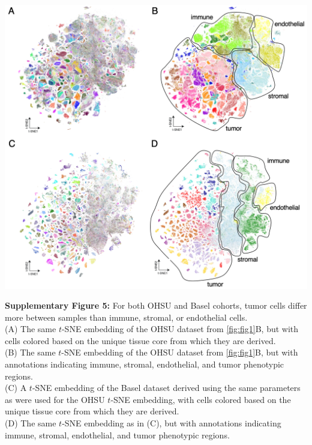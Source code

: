 \documentclass[preprint,review,3p,12pt]{elsarticle}
\begin{document}
\begin{suppfigure}[p]
\centering\includegraphics[width=\linewidth,
                 keepaspectratio]{suppfig5}
\caption{}
\label{fig:suppfig5}
\end{suppfigure}

\newpage

\noindent
\textbf{Supplementary Figure 5:} For both OHSU and Basel cohorts, tumor cells differ more between samples than immune, stromal, or endothelial cells.\\
(A) The same $t$-SNE embedding of the OHSU dataset from \autoref{fig:fig1}B, but with cells colored based on the unique tissue core from which they are derived.\\
(B) The same $t$-SNE embedding of the OHSU dataset from \autoref{fig:fig1}B, but with annotations indicating immune, stromal, endothelial, and tumor phenotypic regions.\\
(C) A $t$-SNE embedding of the Basel dataset \cite{jackson_single-cell_2020} derived using the same parameters as were used for the OHSU $t$-SNE embedding, with cells colored based on the unique tissue core from which they are derived.\\
(D) The same $t$-SNE embedding as in (C), but with annotations indicating immune, stromal, endothelial, and tumor phenotypic regions.
\end{document}
